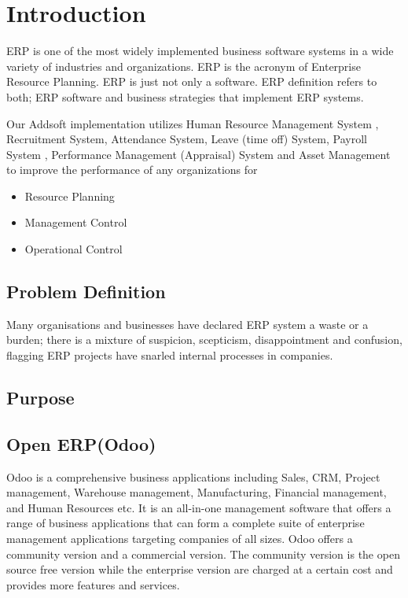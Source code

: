 \chapter{Introduction}

ERP is one of the most widely implemented business software systems in a wide variety of industries and organizations. ERP is the acronym of Enterprise Resource Planning. ERP is just not only a software. ERP definition refers to both; ERP software and business strategies that implement ERP systems. 

Our Addsoft implementation utilizes Human Resource Management System , Recruitment System, Attendance System, Leave (time off) System, Payroll System , Performance Management (Appraisal) System and Asset Management
to improve the performance of  any organizations for

\begin{itemize}
	\item Resource Planning
	\item Management Control 
	\item Operational Control
\end{itemize}

\section{Problem Definition}
Many organisations and businesses have declared ERP system a waste or a burden; there is a mixture of suspicion, scepticism, disappointment and confusion, flagging ERP projects have snarled internal processes in companies.

\section{Purpose}


\section{Open ERP(Odoo)}

Odoo is a comprehensive business applications including Sales, CRM, Project management,
Warehouse management, Manufacturing, Financial management, and Human Resources etc. It is an
all-in-one management software that offers a range of business applications that can form a
complete suite of enterprise management applications targeting companies of all sizes.
Odoo offers a community version and a commercial version. The community version is the open
source free version while the enterprise version are charged at a certain cost and provides more
features and services.

